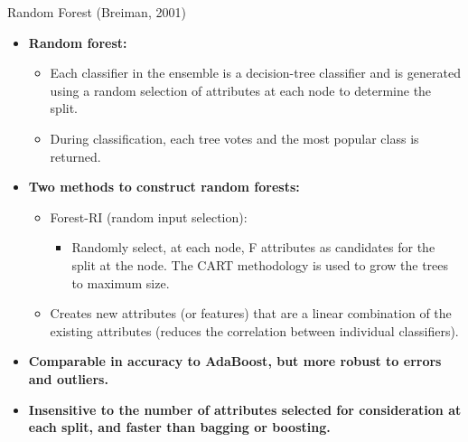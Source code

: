 \begin{frame}{Random Forest (Breiman, 2001)}
  \begin{itemize}
  \item \textbf{Random forest:}
    \begin{itemize}
    \item Each classifier in the ensemble is a decision-tree classifier and is generated using a random selection of attributes at each node to determine the split.
    \item During classification, each tree votes and the most popular class is returned.
    \end{itemize}
  \item \textbf{Two methods to construct random forests:}
    \begin{itemize}
    \item Forest-RI (random input selection):
      \begin{itemize}
      \item Randomly select, at each node, F attributes as candidates for the split at the node. The CART methodology is used to grow the trees to maximum size.
      \end{itemize}
    \item Creates new attributes (or features) that are a linear combination of the existing attributes (reduces the correlation between individual classifiers).
    \end{itemize}
  \item \textbf{Comparable in accuracy to AdaBoost, but more robust to errors and outliers.}
  \item \textbf{Insensitive to the number of attributes selected for consideration at each split, and faster than bagging or boosting.}
  \end{itemize}
\end{frame}

